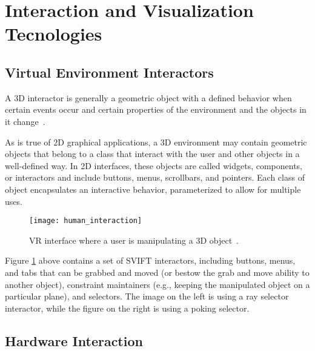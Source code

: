 \section{Interaction and Visualization Tecnologies}
\label{sec:interaction_visualization}


\subsection{Virtual Environment Interactors}
\label{sec:interactors}


A \gls{3D} interactor is generally a geometric object with a defined behavior when certain events 
occur and certain properties of the environment and the objects in it change~\cite{hale2014handbook}.

As is true of \gls{2D} graphical applications, a \gls{3D} environment may contain geometric objects that 
belong to a class that interact with the user and other objects in a well-defined way. In \gls{2D} interfaces, 
these objects are called widgets, components, or interactors and include buttons, menus, scrollbars, 
and pointers. Each class of object encapsulates an interactive behavior, parameterized to allow for 
multiple uses. 



\begin{figure}[h!]
    \centering
    \texttt{[image: human\_interaction]}
    \caption{\gls{VR} interface where a user is manipulating a \gls{3D} object~\cite{hale2014handbook}.} %
    \label{fig:human_interaction}
\end{figure}
\FloatBarrier




Figure \ref{fig:human_interaction} above contains a set of \gls{SVIFT} interactors, including buttons, menus, and tabs
that can be grabbed and moved (or bestow the grab and move ability to another object), constraint maintainers 
(e.g., keeping the manipulated object on a particular plane), and selectors. The image on the left is using a 
ray selector interactor, while the figure on the right is using a poking selector.


\subsection{Hardware Interaction}
\label{sec:hardware_interaction}

